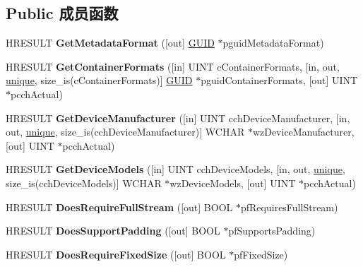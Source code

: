 \subsection*{Public 成员函数}
\begin{DoxyCompactItemize}
\item 
\mbox{\label{interface_i_w_i_c_metadata_handler_info_abae6e5c9243a8c5204abe1354c448c2f}} 
H\+R\+E\+S\+U\+LT {\bfseries Get\+Metadata\+Format} (\mbox{[}out\mbox{]} \hyperlink{interface_g_u_i_d}{G\+U\+ID} $\ast$pguid\+Metadata\+Format)
\item 
\mbox{\label{interface_i_w_i_c_metadata_handler_info_a1e98db9796a1d4d0d25a8beecc0b41d4}} 
H\+R\+E\+S\+U\+LT {\bfseries Get\+Container\+Formats} (\mbox{[}in\mbox{]} U\+I\+NT c\+Container\+Formats, \mbox{[}in, out, \hyperlink{interfaceunique}{unique}, size\+\_\+is(c\+Container\+Formats)\mbox{]} \hyperlink{interface_g_u_i_d}{G\+U\+ID} $\ast$pguid\+Container\+Formats, \mbox{[}out\mbox{]} U\+I\+NT $\ast$pcch\+Actual)
\item 
\mbox{\label{interface_i_w_i_c_metadata_handler_info_af91235dbe5a1ca9dc517defe653553ae}} 
H\+R\+E\+S\+U\+LT {\bfseries Get\+Device\+Manufacturer} (\mbox{[}in\mbox{]} U\+I\+NT cch\+Device\+Manufacturer, \mbox{[}in, out, \hyperlink{interfaceunique}{unique}, size\+\_\+is(cch\+Device\+Manufacturer)\mbox{]} W\+C\+H\+AR $\ast$wz\+Device\+Manufacturer, \mbox{[}out\mbox{]} U\+I\+NT $\ast$pcch\+Actual)
\item 
\mbox{\label{interface_i_w_i_c_metadata_handler_info_a2628594aed3fb2058aeacf020861aa28}} 
H\+R\+E\+S\+U\+LT {\bfseries Get\+Device\+Models} (\mbox{[}in\mbox{]} U\+I\+NT cch\+Device\+Models, \mbox{[}in, out, \hyperlink{interfaceunique}{unique}, size\+\_\+is(cch\+Device\+Models)\mbox{]} W\+C\+H\+AR $\ast$wz\+Device\+Models, \mbox{[}out\mbox{]} U\+I\+NT $\ast$pcch\+Actual)
\item 
\mbox{\label{interface_i_w_i_c_metadata_handler_info_ae85ed6e20b6cf06ab6900192ab20b452}} 
H\+R\+E\+S\+U\+LT {\bfseries Does\+Require\+Full\+Stream} (\mbox{[}out\mbox{]} B\+O\+OL $\ast$pf\+Requires\+Full\+Stream)
\item 
\mbox{\label{interface_i_w_i_c_metadata_handler_info_a02898f364c1734e0af048900b3038c93}} 
H\+R\+E\+S\+U\+LT {\bfseries Does\+Support\+Padding} (\mbox{[}out\mbox{]} B\+O\+OL $\ast$pf\+Supports\+Padding)
\item 
\mbox{\label{interface_i_w_i_c_metadata_handler_info_afe78b998d61d2c4ddcc13fa13d2d1e24}} 
H\+R\+E\+S\+U\+LT {\bfseries Does\+Require\+Fixed\+Size} (\mbox{[}out\mbox{]} B\+O\+OL $\ast$pf\+Fixed\+Size)
\end{DoxyCompactItemize}
